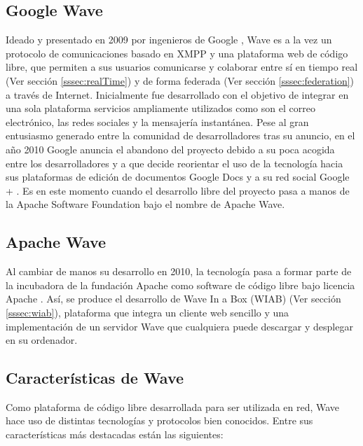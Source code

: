   \subsection{Google Wave}\label{ssec:wave}

  Ideado y presentado en 2009 por ingenieros de Google \cite{ref:wave_announcement}, Wave es a la vez un protocolo de comunicaciones basado en XMPP \cite{ref:wave_over_xmpp}y una plataforma web de código libre, que permiten a sus usuarios comunicarse y colaborar entre sí en tiempo real (Ver sección \ref{sssec:realTime}) y de forma federada (Ver sección \ref{sssec:federation}) a través de Internet. 
  Inicialmente fue desarrollado con el objetivo de integrar en una sola plataforma servicios ampliamente utilizados como son el correo electrónico, las redes sociales y la mensajería instantánea. Pese al gran entusiasmo generado entre la comunidad de desarrolladores tras su anuncio, en el año 2010 Google anuncia el abandono del proyecto \cite{ref:google_wave_end} debido a su poca acogida entre los desarrolladores y a que decide reorientar el uso de la tecnología hacia sus plataformas de edición de documentos Google Docs \cite{ref:google_docs} y a su red social Google + \cite{ref:google_plus}.  Es en este momento cuando el desarrollo libre del proyecto pasa a manos de la Apache Software Foundation bajo el nombre de Apache Wave.

  \subsection{Apache Wave}
  
  Al cambiar de manos su desarrollo en 2010, la tecnología pasa a formar parte de la incubadora de la fundación Apache \cite{ref:apache_wave_about} como software de código libre bajo licencia Apache \cite{ref:apache_license}. Así, se produce el desarrollo de Wave In a Box (WIAB) (Ver sección \ref{sssec:wiab}), plataforma que integra un cliente web sencillo y una implementación de un servidor Wave que cualquiera puede descargar y desplegar en su ordenador.
  
  \subsection{Características de Wave}
  
  Como plataforma de código libre desarrollada para ser utilizada en red, Wave hace uso de distintas tecnologías y protocolos bien conocidos. Entre sus características más destacadas están las siguientes:

